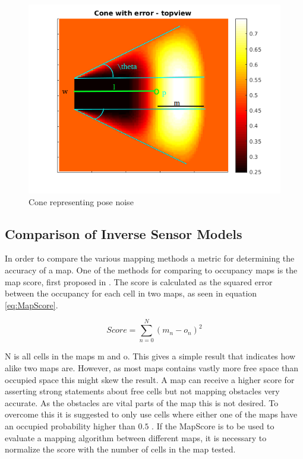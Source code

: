 \begin{figure}[htbp]
	\centering
	\includegraphics[width=\textwidth]{figures/static_mapping/cone_noise_top}
	\caption{Cone representing pose noise}
	\label{fig:cone_with_noise_top}
\end{figure}

\subsection{Comparison of Inverse Sensor Models}
In order to compare the various mapping methods a metric for determining the accuracy of a map. One of the methods for comparing to occupancy maps is the map score, first proposed in \cite{MoravecMartin}. The score is calculated as the squared error between the occupancy for each cell in two maps, as seen in equation \vref{eq:MapScore}.

\begin{equation}
\label{eq:MapScore}
Score = \sum_{n=0}^{N} (m_{n} - o_{n})^2
\end{equation}

N is all cells in the maps m and o. 
This gives a simple result that indicates how alike two maps are. 
However, as most maps contains vastly more free space than occupied space this might skew the result. 
A map can receive a higher score for asserting strong statements about free cells but not mapping obstacles very accurate. 
As the obstacles are vital parts of the map this is not desired. 
To overcome this it is suggested to only use cells where either one of the maps have an occupied probability higher than \(0.5\) \cite{Sullivan2003}. 
If the MapScore is to be used to evaluate a mapping algorithm between different maps, it is necessary to normalize the score with the number of cells in the map tested. 


